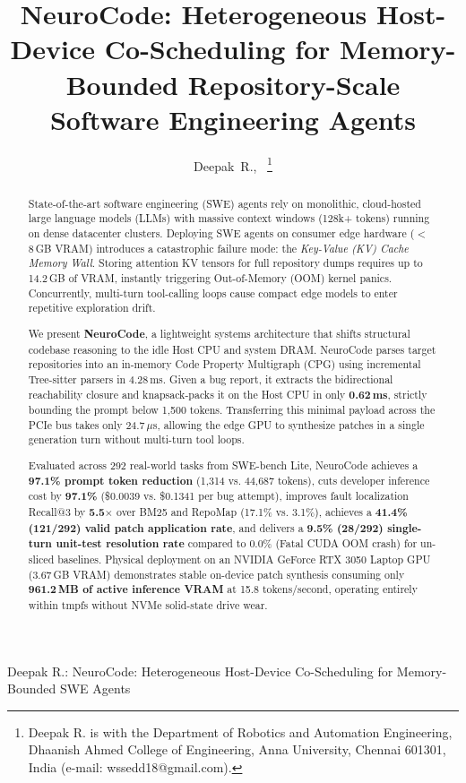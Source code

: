 \documentclass[journal]{IEEEtran}
\begin{document}
\title{NeuroCode: Heterogeneous Host-Device Co-Scheduling for Memory-Bounded Repository-Scale Software Engineering Agents}

\author{Deepak~R.,~%
\thanks{Deepak R. is with the Department of Robotics and Automation Engineering, Dhaanish Ahmed College of Engineering, Anna University, Chennai 601301, India (e-mail: wssedd18@gmail.com).}%
}

%
{Deepak R.: NeuroCode: Heterogeneous Host-Device Co-Scheduling for Memory-Bounded SWE Agents}

\maketitle

\begin{abstract}
State-of-the-art software engineering (SWE) agents rely on monolithic, cloud-hosted large language models (LLMs) with massive context windows (128k+ tokens) running on dense datacenter clusters. Deploying SWE agents on consumer edge hardware ($<$ 8\,GB VRAM) introduces a catastrophic failure mode: the \textit{Key-Value (KV) Cache Memory Wall}. Storing attention KV tensors for full repository dumps requires up to 14.2\,GB of VRAM, instantly triggering Out-of-Memory (OOM) kernel panics. Concurrently, multi-turn tool-calling loops cause compact edge models to enter repetitive exploration drift. 

We present \textbf{NeuroCode}, a lightweight systems architecture that shifts structural codebase reasoning to the idle Host CPU and system DRAM. NeuroCode parses target repositories into an in-memory Code Property Multigraph (CPG) using incremental Tree-sitter parsers in 4.28\,ms. Given a bug report, it extracts the bidirectional reachability closure and knapsack-packs it on the Host CPU in only \textbf{0.62\,ms}, strictly bounding the prompt below 1,500 tokens. Transferring this minimal payload across the PCIe bus takes only 24.7\,$\mu$s, allowing the edge GPU to synthesize patches in a single generation turn without multi-turn tool loops. 

Evaluated across 292 real-world tasks from SWE-bench Lite, NeuroCode achieves a \textbf{97.1\% prompt token reduction} (1,314 vs. 44,687 tokens), cuts developer inference cost by \textbf{97.1\%} (\$0.0039 vs. \$0.1341 per bug attempt), improves fault localization Recall@3 by \textbf{5.5$\times$} over BM25 and RepoMap (17.1\% vs. 3.1\%), achieves a \textbf{41.4\% (121/292) valid patch application rate}, and delivers a \textbf{9.5\% (28/292) single-turn unit-test resolution rate} compared to 0.0\% (Fatal CUDA OOM crash) for un-sliced baselines. Physical deployment on an NVIDIA GeForce RTX 3050 Laptop GPU (3.67\,GB VRAM) demonstrates stable on-device patch synthesis consuming only \textbf{961.2\,MB of active inference VRAM} at 15.8 tokens/second, operating entirely within tmpfs without NVMe solid-state drive wear.
\end{abstract}
\end{document}
